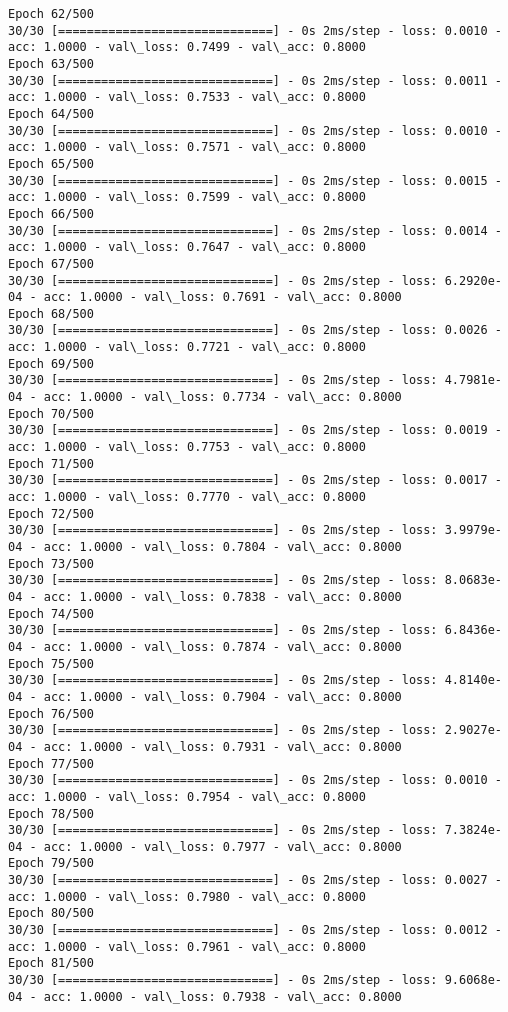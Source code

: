 \documentclass[11pt]{article}
\begin{document}
\begin{Verbatim}[commandchars=\\\{\}]
Epoch 62/500
30/30 [==============================] - 0s 2ms/step - loss: 0.0010 - acc: 1.0000 - val\_loss: 0.7499 - val\_acc: 0.8000
Epoch 63/500
30/30 [==============================] - 0s 2ms/step - loss: 0.0011 - acc: 1.0000 - val\_loss: 0.7533 - val\_acc: 0.8000
Epoch 64/500
30/30 [==============================] - 0s 2ms/step - loss: 0.0010 - acc: 1.0000 - val\_loss: 0.7571 - val\_acc: 0.8000
Epoch 65/500
30/30 [==============================] - 0s 2ms/step - loss: 0.0015 - acc: 1.0000 - val\_loss: 0.7599 - val\_acc: 0.8000
Epoch 66/500
30/30 [==============================] - 0s 2ms/step - loss: 0.0014 - acc: 1.0000 - val\_loss: 0.7647 - val\_acc: 0.8000
Epoch 67/500
30/30 [==============================] - 0s 2ms/step - loss: 6.2920e-04 - acc: 1.0000 - val\_loss: 0.7691 - val\_acc: 0.8000
Epoch 68/500
30/30 [==============================] - 0s 2ms/step - loss: 0.0026 - acc: 1.0000 - val\_loss: 0.7721 - val\_acc: 0.8000
Epoch 69/500
30/30 [==============================] - 0s 2ms/step - loss: 4.7981e-04 - acc: 1.0000 - val\_loss: 0.7734 - val\_acc: 0.8000
Epoch 70/500
30/30 [==============================] - 0s 2ms/step - loss: 0.0019 - acc: 1.0000 - val\_loss: 0.7753 - val\_acc: 0.8000
Epoch 71/500
30/30 [==============================] - 0s 2ms/step - loss: 0.0017 - acc: 1.0000 - val\_loss: 0.7770 - val\_acc: 0.8000
Epoch 72/500
30/30 [==============================] - 0s 2ms/step - loss: 3.9979e-04 - acc: 1.0000 - val\_loss: 0.7804 - val\_acc: 0.8000
Epoch 73/500
30/30 [==============================] - 0s 2ms/step - loss: 8.0683e-04 - acc: 1.0000 - val\_loss: 0.7838 - val\_acc: 0.8000
Epoch 74/500
30/30 [==============================] - 0s 2ms/step - loss: 6.8436e-04 - acc: 1.0000 - val\_loss: 0.7874 - val\_acc: 0.8000
Epoch 75/500
30/30 [==============================] - 0s 2ms/step - loss: 4.8140e-04 - acc: 1.0000 - val\_loss: 0.7904 - val\_acc: 0.8000
Epoch 76/500
30/30 [==============================] - 0s 2ms/step - loss: 2.9027e-04 - acc: 1.0000 - val\_loss: 0.7931 - val\_acc: 0.8000
Epoch 77/500
30/30 [==============================] - 0s 2ms/step - loss: 0.0010 - acc: 1.0000 - val\_loss: 0.7954 - val\_acc: 0.8000
Epoch 78/500
30/30 [==============================] - 0s 2ms/step - loss: 7.3824e-04 - acc: 1.0000 - val\_loss: 0.7977 - val\_acc: 0.8000
Epoch 79/500
30/30 [==============================] - 0s 2ms/step - loss: 0.0027 - acc: 1.0000 - val\_loss: 0.7980 - val\_acc: 0.8000
Epoch 80/500
30/30 [==============================] - 0s 2ms/step - loss: 0.0012 - acc: 1.0000 - val\_loss: 0.7961 - val\_acc: 0.8000
Epoch 81/500
30/30 [==============================] - 0s 2ms/step - loss: 9.6068e-04 - acc: 1.0000 - val\_loss: 0.7938 - val\_acc: 0.8000

\end{Verbatim}
\end{document}
